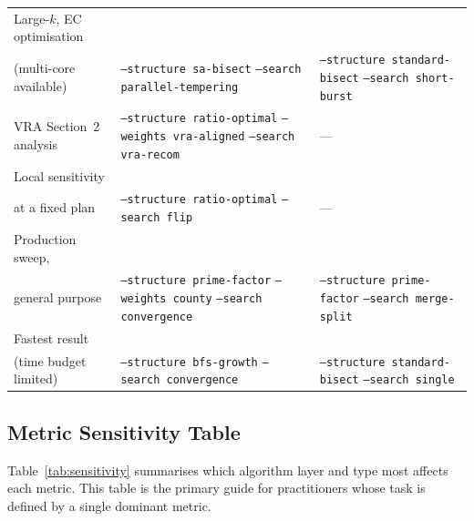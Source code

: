 \begin{table}[ht]
\begin{tabular}{@{}p{4.5cm}p{4.2cm}p{4.2cm}@{}}
Large-$k$, EC optimisation\\(multi-core available)
  & \texttt{--structure sa-bisect}\newline
    \texttt{--search parallel-tempering}
  & \texttt{--structure standard-bisect}\newline
    \texttt{--search short-burst} \\[6pt]
VRA Section~2 analysis
  & \texttt{--structure ratio-optimal}\newline
    \texttt{--weights vra-aligned}\newline
    \texttt{--search vra-recom}
  & --- \\[6pt]
Local sensitivity\\at a fixed plan
  & \texttt{--structure ratio-optimal}\newline
    \texttt{--search flip}
  & --- \\[6pt]
Production sweep,\\general purpose
  & \texttt{--structure prime-factor}\newline
    \texttt{--weights county}\newline
    \texttt{--search convergence}
  & \texttt{--structure prime-factor}\newline
    \texttt{--search merge-split} \\[6pt]
Fastest result\\(time budget limited)
  & \texttt{--structure bfs-growth}\newline
    \texttt{--search convergence}
  & \texttt{--structure standard-bisect}\newline
    \texttt{--search single} \\
\bottomrule
\end{tabular}
\end{table}

\subsection{Metric Sensitivity Table}

Table~\ref{tab:sensitivity} summarises which algorithm layer and type most
affects each metric.
This table is the primary guide for practitioners whose task is defined by
a single dominant metric.

